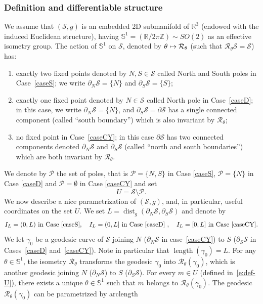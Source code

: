 \documentclass[JEP,XML,SOM,Unicode]{cedram}
\newcommand\mto{\mathchoice{\longmapsto}{\mapsto}{\mapsto}{\mapsto}}
\theoremstyle{definition}
\newcommand{\calR}{\ensuremath{\mathcal R}}
\renewcommand{\P}{\ensuremath{\mathcal P}}
\newcommand{\calS}{\ensuremath{\mathcal S}}
\newcommand{\mb}[1]{\ensuremath{\mathbb{#1}}}
\newcommand{\R}{{\mb{R}}}
\newcommand{\bS}{\ensuremath{\mathbb S}}
\newcommand{\Z}{\mathbb Z}
\DeclareMathOperator{\dist}{dist}
\DeclareMathOperator{\length}{length}
\let\d\partial
\begin{document}
\subsubsection*{Definition and differentiable structure}
We assume that $(\calS, g)$ is an embedded 2D submanifold of $\R^3$ (endowed with the induced Euclidean structure), having $\bS^1 = (\R/2\pi\Z) \sim SO(2)$ as an effective isometry group.
The action of $\bS^1$ on $\calS$, denoted by $\theta \mto \calR_\theta$ (such that $\calR_\theta \calS = \calS$) has:
\begin{enumerate}
\item exactly two fixed points denoted by $N, S \in \calS$ called North and South poles in Case~\ref{caseS}; we write $\d_N \calS = \{N\}$ and $\d_S \calS = \{S\}$;
\item exactly one fixed point denoted by $N \in \calS$ called North pole in Case~\ref{caseD}; in this case, we write $\d_N \calS = \{N\}$, and $\d_S \mathcal{S} = \d\mathcal{S}$ has a single connected component (called ``south boundary'') which is also invariant by $\calR_\theta$;
\item no fixed point in Case~\ref{caseCY}; in this case $\d\mathcal{S}$ has two connected components denoted $\d_N\calS$ and $\d_S\calS$ (called ``north and south boundaries'') which are both invariant by $\calR_\theta$.
\end{enumerate}
We denote by $\mathcal{P}$ the set of poles, that is $\P=\{N,S\}$ in Case \ref{caseS}, $\mathcal{P}=\{N\}$ in Case \ref{caseD} and $\mathcal{P}=\emptyset$ in Case \ref{caseCY} and set
\begin{equation}
\label{e:def-U}
U =\calS \setminus \P.
\end{equation}
We now describe a nice parametrization of $(\calS, g)$, and, in particular, useful coordinates on the set $U$. We set $L= \dist_g(\d_N \calS, \d_S \calS)$ and denote by
\begin{equation}
\label{e:def-IL}
I_L=(0,L) \text{ in Case \ref{caseS}}, \quad I_L=(0,L] \text{ in Case \ref{caseD} }, \quad I_L=[0,L] \text{ in Case \ref{caseCY}}.
\end{equation}
We let $\gamma_0$ be a geodesic curve of $\calS$ joining $N$ (\resp $\d_N \calS$ in case~\ref{caseCY}) to $S$ (\resp $\d_S \calS$ in Cases~\ref{caseD} and~\ref{caseCY}). Note in particular that $\length(\gamma_0) = L$. For any $\theta \in \bS^1$, the isometry $\calR_\theta$ transforms the geodesic $\gamma_0$ into $\calR_\theta (\gamma_0)$, which is another geodesic joining $N$ (\resp $\d_N \calS$) to $S$ (\resp $\d_S \calS$). For every $m \in U$ (defined in~\eqref{e:def-U}), there exists a unique $\theta \in \bS^1$ such that $m$ belongs to $\calR_\theta (\gamma_0)$. The geodesic $\calR_\theta (\gamma_0)$ can be parametrized by arclength
\end{document}
